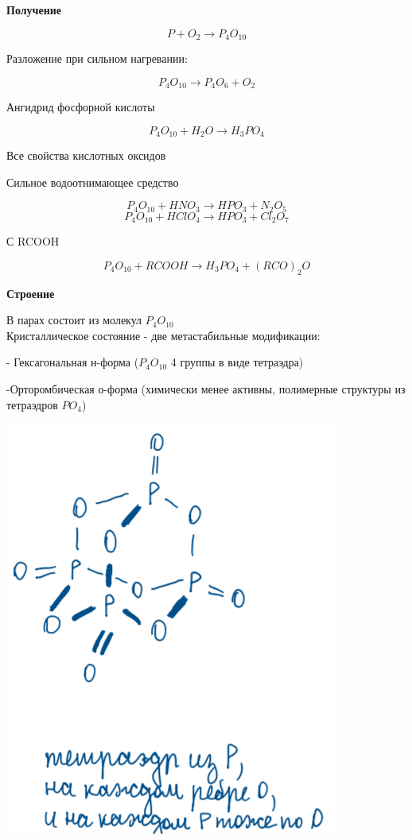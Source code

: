 \textbf{Получение}

$$ P + O_2 \rightarrow P_4O_{10}$$

Разложение при сильном нагревании:

$$P_4O_{10} \rightarrow P_4O_6 + O_2$$

Ангидрид фосфорной кислоты

$$P_4O_{10} + H_2O \rightarrow H_3PO_4$$

Все свойства кислотных оксидов

Сильное водоотнимающее средство 

$$P_4O_{10} + HNO_3 \rightarrow HPO_3 + N_2O_5$$
$$P_4O_{10} + HClO_4 \rightarrow HPO_3 + Cl_2O_7$$

С RCOOH

$$P_4O_{10} + RCOOH \rightarrow H_3PO_4 + (RCO)_2O$$

\textbf{Строение}

В парах состоит из молекул $P_4O_{10}$\\
Кристаллическое состояние - две метастабильные модификации:

- Гексагональная н-форма ($P_4O_{10}$ 4 группы в виде тетраэдра)

-Орторомбическая о-форма (химически менее активны, полимерные структуры из тетраэдров $PO_4$)

\includegraphics{images/9v6.png}

